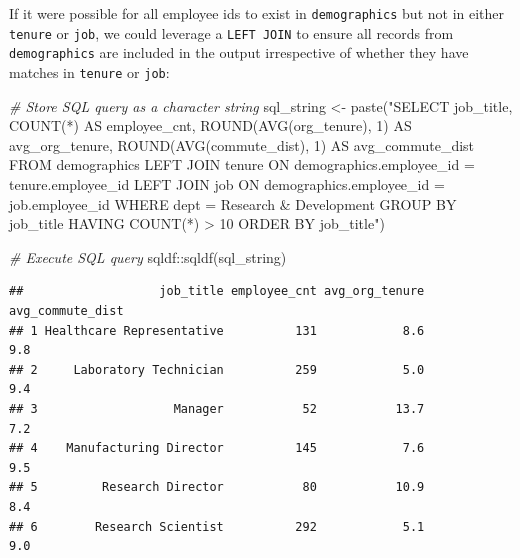 \documentclass[
]{book}
\newenvironment{Shaded}{\begin{snugshade}}{\end{snugshade}}
\newcommand{\CommentTok}[1]{\textcolor[rgb]{0.56,0.35,0.01}{\textit{#1}}}
\newcommand{\FunctionTok}[1]{\textcolor[rgb]{0.00,0.00,0.00}{#1}}
\newcommand{\NormalTok}[1]{#1}
\newcommand{\OtherTok}[1]{\textcolor[rgb]{0.56,0.35,0.01}{#1}}
\newcommand{\SpecialCharTok}[1]{\textcolor[rgb]{0.00,0.00,0.00}{#1}}
\newcommand{\StringTok}[1]{\textcolor[rgb]{0.31,0.60,0.02}{#1}}
\begin{document}
If it were possible for all employee ids to exist in \texttt{demographics} but not in either \texttt{tenure} or \texttt{job}, we could leverage a \texttt{LEFT\ JOIN} to ensure all records from \texttt{demographics} are included in the output irrespective of whether they have matches in \texttt{tenure} or \texttt{job}:

\begin{Shaded}
\begin{Highlighting}[]
\CommentTok{\# Store SQL query as a character string}
\NormalTok{sql\_string }\OtherTok{\textless{}{-}} \FunctionTok{paste}\NormalTok{(}\StringTok{"SELECT}
\StringTok{                      job\_title,}
\StringTok{                      COUNT(*) AS employee\_cnt,}
\StringTok{                      ROUND(AVG(org\_tenure), 1) AS avg\_org\_tenure,}
\StringTok{                      ROUND(AVG(commute\_dist), 1) AS avg\_commute\_dist}
\StringTok{                    FROM}
\StringTok{                        demographics}
\StringTok{                      LEFT JOIN}
\StringTok{                        tenure}
\StringTok{                      ON}
\StringTok{                        demographics.employee\_id = tenure.employee\_id}
\StringTok{                      LEFT JOIN}
\StringTok{                        job}
\StringTok{                      ON}
\StringTok{                        demographics.employee\_id = job.employee\_id}
\StringTok{                    WHERE}
\StringTok{                      dept = \textquotesingle{}Research \& Development\textquotesingle{}}
\StringTok{                    GROUP BY}
\StringTok{                      job\_title}
\StringTok{                    HAVING}
\StringTok{                      COUNT(*) \textgreater{} 10}
\StringTok{                    ORDER BY}
\StringTok{                      job\_title"}\NormalTok{)}

\CommentTok{\# Execute SQL query}
\NormalTok{sqldf}\SpecialCharTok{::}\FunctionTok{sqldf}\NormalTok{(sql\_string)}
\end{Highlighting}
\end{Shaded}

\begin{verbatim}
##                   job_title employee_cnt avg_org_tenure avg_commute_dist
## 1 Healthcare Representative          131            8.6              9.8
## 2     Laboratory Technician          259            5.0              9.4
## 3                   Manager           52           13.7              7.2
## 4    Manufacturing Director          145            7.6              9.5
## 5         Research Director           80           10.9              8.4
## 6        Research Scientist          292            5.1              9.0
\end{verbatim}
\end{document}
